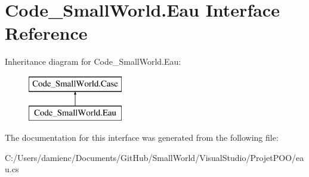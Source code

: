 \hypertarget{interface_code___small_world_1_1_eau}{\section{Code\-\_\-\-Small\-World.\-Eau Interface Reference}
\label{interface_code___small_world_1_1_eau}
}
Inheritance diagram for Code\-\_\-\-Small\-World.\-Eau\-:\begin{figure}[H]
\begin{center}
\leavevmode
\includegraphics[height=2.000000cm]{interface_code___small_world_1_1_eau}
\end{center}
\end{figure}


The documentation for this interface was generated from the following file\-:\begin{DoxyCompactItemize}
\item 
C\-:/\-Users/damienc/\-Documents/\-Git\-Hub/\-Small\-World/\-Visual\-Studio/\-Projet\-P\-O\-O/eau.\-cs\end{DoxyCompactItemize}
